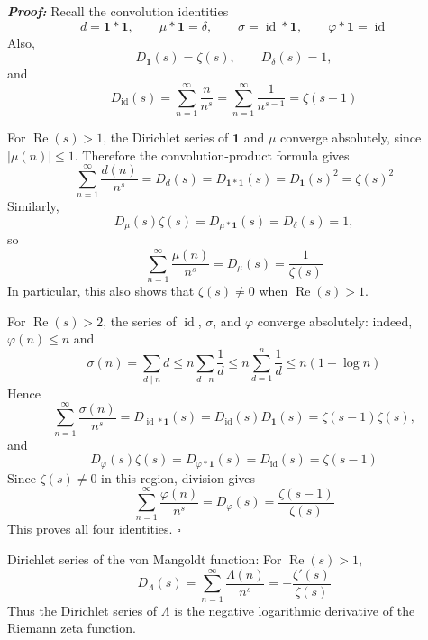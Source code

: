 \documentclass[a4paper,11pt,abstracton]{scrartcl}
\theoremstyle{dotlessP}
\theoremstyle{dotlessS}
\theoremstyle{remark}
\theoremstyle{definition}
\begin{document}
\begin{claim_box}
\textbf{\textit{Proof:}}
Recall the convolution identities
\[
    d=\mathbf{1}*\mathbf{1},
    \qquad
    \mu*\mathbf{1}=\delta,
    \qquad
    \sigma=\operatorname{id}*\mathbf{1},
    \qquad
    \varphi*\mathbf{1}=\operatorname{id}
\]
Also,
\[
    D_{\mathbf{1}}(s)=\zeta(s),
    \qquad
    D_\delta(s)=1,
\]
and
\[
    D_{\operatorname{id}}(s)
      =\sum_{n=1}^{\infty}\frac{n}{n^s}
      =\sum_{n=1}^{\infty}\frac1{n^{s-1}}
      =\zeta(s-1)
\]

For $\operatorname{Re}(s)>1$, the Dirichlet series of
$\mathbf{1}$ and $\mu$ converge absolutely, since
$|\mu(n)|\leq1$. Therefore the convolution-product formula gives
\[
    \sum_{n=1}^{\infty}\frac{d(n)}{n^s}
      =D_d(s)
      =D_{\mathbf{1}*\mathbf{1}}(s)
      =D_{\mathbf{1}}(s)^2
      =\zeta(s)^2
\]
Similarly,
\[
    D_\mu(s)\zeta(s)
      =D_{\mu*\mathbf{1}}(s)
      =D_\delta(s)=1,
\]
so
\begin{equation}
\label{eq:mu-dirichlet-series}
    \sum_{n=1}^{\infty}\frac{\mu(n)}{n^s}
      =D_\mu(s)=\frac1{\zeta(s)}
\end{equation}
In particular, this also shows that $\zeta(s)\neq0$ when
$\operatorname{Re}(s)>1$.

For $\operatorname{Re}(s)>2$, the series of
$\operatorname{id}$, $\sigma$, and $\varphi$ converge absolutely:
indeed, $\varphi(n)\leq n$ and
\[
    \sigma(n)=\sum_{d\mid n}d
      \leq n\sum_{d\mid n}\frac1d
      \leq n\sum_{d=1}^{n}\frac1d
      \leq n(1+\log n)
\]
Hence
\[
    \sum_{n=1}^{\infty}\frac{\sigma(n)}{n^s}
      =D_{\operatorname{id}*\mathbf{1}}(s)
      =D_{\operatorname{id}}(s)D_{\mathbf{1}}(s)
      =\zeta(s-1)\zeta(s),
\]
and
\[
    D_\varphi(s)\zeta(s)
      =D_{\varphi*\mathbf{1}}(s)
      =D_{\operatorname{id}}(s)
      =\zeta(s-1)
\]
Since $\zeta(s)\neq0$ in this region, division gives
\[
    \sum_{n=1}^{\infty}\frac{\varphi(n)}{n^s}
      =D_\varphi(s)=\frac{\zeta(s-1)}{\zeta(s)}
\]
This proves all four identities.
\hfill$\square$
\end{claim_box}

\begin{mainbox}{Dirichlet series of the von Mangoldt function:}
For $\operatorname{Re}(s)>1$,
\[
    D_\Lambda(s)
      =\sum_{n=1}^{\infty}\frac{\Lambda(n)}{n^s}
      =-\frac{\zeta'(s)}{\zeta(s)}
\]
Thus the Dirichlet series of $\Lambda$ is the negative logarithmic
derivative of the Riemann zeta function.
\end{mainbox}
\end{document}
